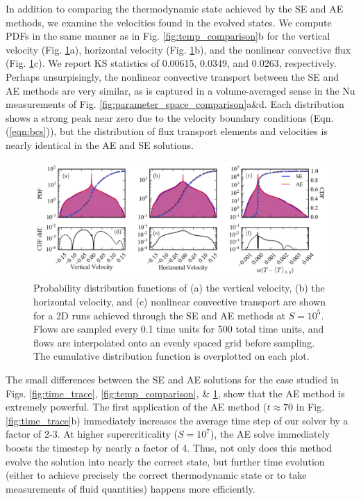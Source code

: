 \documentclass[aps, pre, onecolumn, nofootinbib, notitlepage, groupedaddress, amsfonts, amssymb, amsmath, longbibliography]{revtex4-1}
\begin{document}
In addition to comparing the thermodynamic state achieved by the SE and AE methods,
we examine the velocities found in the evolved states.
We compute PDFs in the same manner as in Fig. \ref{fig:temp_comparison}b for the
vertical velocity (Fig. \ref{fig:pdf_comparison}a), horizontal velocity (Fig. \ref{fig:pdf_comparison}b),
and the nonlinear convective flux (Fig. \ref{fig:pdf_comparison}c). We report KS statistics
of 0.00615, 0.0349, and 0.0263, respectively.  Perhaps unsurpisingly, the nonlinear
convective transport between the SE and AE methods are very similar, as is captured
in a volume-averaged sense in the Nu measurements of Fig. \ref{fig:parameter_space_comparison}a\&d.
Each distribution shows a strong peak near zero due to the velocity boundary conditions
(Eqn. (\ref{eqn:bcs})), but the distribution of flux transport elements and velocities
is nearly identical in the AE and SE solutions.

\begin{figure}[t]
\includegraphics[width=\textwidth]{./figs/pdf_comparison.png}
\caption{Probability distribution functions of (a) the vertical velocity, (b) the horizontal velocity, and (c) nonlinear
convective transport are shown for a 2D runs achieved through the SE and AE methods
at $S = 10^{5}$.  Flows are sampled every 0.1 time units for 500 total time units,
and flows are interpolated onto an evenly spaced grid before sampling.
The cumulative distribution function is overplotted on each plot. 
\label{fig:pdf_comparison} }
\end{figure}


The small differences between the SE and AE solutions for the case studied in 
Figs. \ref{fig:time_trace}, \ref{fig:temp_comparison}, \& \ref{fig:pdf_comparison},
show that the AE method is extremely powerful.  The first application of the AE method
($t \approx 70$ in Fig. \ref{fig:time_trace}b) immediately increases the 
average time step of our solver by a factor of 2-3. At higher supercriticality
($S = 10^7$), the AE solve immediately boosts the timestep by nearly a factor of 4.
Thus, not only does this method evolve the solution into nearly the correct state, 
but further time evolution (either to achieve precisely the correct thermodynamic
state or to take measurements of fluid quantities) happens more efficiently.
\end{document}
